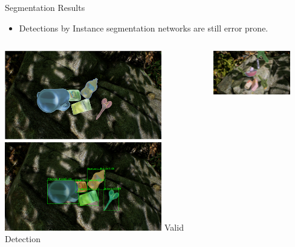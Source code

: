 \documentclass[18pt]{beamer}
\begin{document}
\begin{frame}{Segmentation Results}
\begin{itemize}
    \item Detections by Instance segmentation networks are still error prone.
\end{itemize}
\begin{columns}
    \begin{column}{0.5\textwidth}
        \centering
        \includegraphics[width=0.8\textwidth]{figures/example_output_anns.png}
        \includegraphics[width=0.8\textwidth]{figures/cmrcnn_mobilenet_fat_2.png}
        \vfill
        Valid Detection
    \end{column}
    \begin{column}{0.5\textwidth}
        \centering
    	\includegraphics[width=0.8\textwidth]{figures/fat_example_ann.pdf}

\end{column}
\end{columns}
\end{frame}
\end{document}
